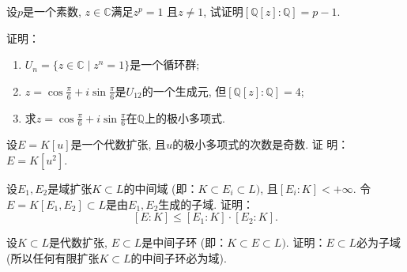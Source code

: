 \begin{problem}
    设$p$是一个素数, $z \in \mathbb{C}$满足$z^p = 1$
且$z \neq 1$, 试证明$[\mathbb{Q}[z]:\mathbb{Q}] = p - 1$.
\end{problem}

\begin{solution}
    
\end{solution}

\begin{problem}
    证明：
\begin{enumerate}[(1)]
    \item $U_n = \{z \in \mathbb{C} \mid z^n = 1\}$是一个循环群;
    \item $z = \cos \frac\pi6 + i\sin \frac\pi6$是$U_{12}$的一个生成元,
但$[\mathbb{Q}[z]:\mathbb{Q}] = 4$;
    \item 求$z = \cos \frac\pi6 + i\sin \frac\pi6$在$\mathbb{Q}$上的极小多项式.
\end{enumerate}
\end{problem}

\begin{solution}
    
\end{solution}

\begin{problem}
    设$E = K[u]$是一个代数扩张, 且$u$的极小多项式的次数是奇数. 证
明：$E = K[u^2]$.
\end{problem}

\begin{solution}
    
\end{solution}

\begin{problem}
    设$E_1, E_2$是域扩张$K \subset L$的中间域
(即：$K \subset E_i \subset L)$, 且$[E_i:K] < +\infty$.
令$E = K[E_1,E_2] \subset L$是由$E_1, E_2$生成的子域.
证明：
\[
    [E:K] \leqslant [E_1:K] \cdot [E_2:K].
\]
\end{problem}

\begin{solution}
    
\end{solution}

\begin{problem}
    设$K \subset L$是代数扩张, $E \subset L$是中间子环
(即：$K \subset E \subset L)$. 证明：$E\subset L$必为子域
(所以任何有限扩张$K \subset L$的中间子环必为域).
\end{problem}

